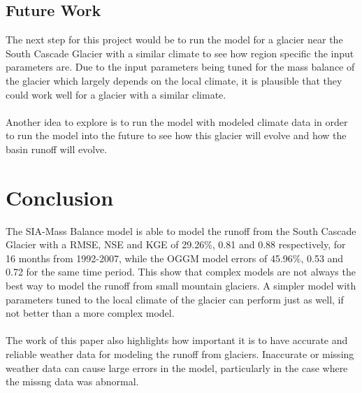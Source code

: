 \documentclass{article}
\begin{document}
\subsection{Future Work}
The next step for this project would be to run the model for a glacier near the South Cascade Glacier with a similar climate to see how region specific the input 
parameters are. Due to the input parameters being tuned for the mass balance of the glacier which largely depends on the local climate, it 
is plausible that they could work well for a glacier with a similar climate.
\paragraph{}
Another idea to explore is to run the model with modeled climate data in order to run the model into the future to see how this glacier 
will evolve and how the basin runoff will evolve.
\section{Conclusion}
The SIA-Mass Balance model is able to model the runoff from the South Cascade Glacier with a RMSE, NSE and KGE of 29.26\%, 0.81 and 0.88 respectively, 
for 16 months from 1992-2007, while the OGGM model errors of 45.96\%, 0.53 and 0.72 for the same time period. This show that complex models are not always 
the best way to model the runoff from small mountain glaciers. A simpler model with parameters tuned to the local climate of the glacier can 
perform just as well, if not better than a more complex model. 
\paragraph{}
The work of this paper also highlights how important it is to have accurate and reliable weather data for modeling the runoff from glaciers. Inaccurate or 
missing weather data can cause large errors in the model, particularly in the case where the missng data was abnormal.
\end{document}
